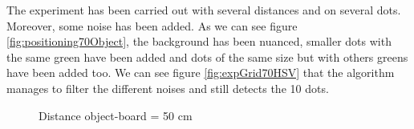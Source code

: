 The experiment has been carried out with several distances and on several dots. Moreover, some noise has been added. As we can see figure \ref{fig:positioning70Object}, the background has been nuanced, smaller dots with the same green have been added and dots of the same size but with others greens have been added too. We can see figure \ref{fig:expGrid70HSV} that the algorithm manages to filter the different noises and still detects the 10 dots.



\begin{figure}[!h] 
\centering
{}
\quad 
{}
\caption{Distance object-board = 50 cm}
\end{figure}

